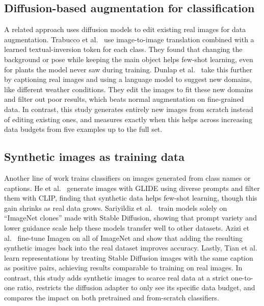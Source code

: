\documentclass{scrartcl}
\begin{document}
\subsection{Diffusion-based augmentation for classification}
A related approach uses diffusion models to edit existing real images for data augmentation. Trabucco et al.~\cite{trabucco2024effective} use image-to-image translation combined with a learned textual-inversion token for each class. They found that changing the background or pose while keeping the main object helps few-shot learning, even for plants the model never saw during training. Dunlap et al.~\cite{dunlap2023diversify} take this further by captioning real images and using a language model to suggest new domains, like different weather conditions. They edit the images to fit these new domains and filter out poor results, which beats normal augmentation on fine-grained data. In contrast, this study generates entirely new images from scratch instead of editing existing ones, and measures exactly when this helps across increasing data budgets from five examples up to the full set.

\subsection{Synthetic images as training data}
Another line of work trains classifiers on images generated from class names or captions. He et al.~\cite{he2023synthetic} generate images with GLIDE using diverse prompts and filter them with CLIP, finding that synthetic data helps few-shot learning, though this gain shrinks as real data grows. Sariyildiz et al.~\cite{sariyildiz2023fake} train models solely on ``ImageNet clones'' made with Stable Diffusion, showing that prompt variety and lower guidance scale help these models transfer well to other datasets. Azizi et al.~\cite{azizi2023synthetic} fine-tune Imagen on all of ImageNet and show that adding the resulting synthetic images back into the real dataset improves accuracy. Lastly, Tian et al.~\cite{tian2023stablerep} learn representations by treating Stable Diffusion images with the same caption as positive pairs, achieving results comparable to training on real images. In contrast, this study adds synthetic images to scarce real data at a strict one-to-one ratio, restricts the diffusion adapter to only see its specific data budget, and compares the impact on both pretrained and from-scratch classifiers.
\end{document}
